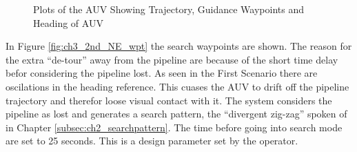 		\begin{figure}[htbp]
			\caption{Plots of the AUV Showing Trajectory, Guidance Waypoints and Heading of AUV}
			\label{fig:ch3_2nd_NE_plots}
		\end{figure}
		In Figure \ref{fig:ch3_2nd_NE_wpt} the search waypoints are shown. The reason for the extra
		``de-tour'' away from the pipeline are because of the short time delay befor considering the
		pipeline lost. As seen in the First Scenario there are oscilations in the heading reference.
		This cuases the AUV to drift off the pipeline trajectory and therefor loose visual contact
		with it. The system considers the pipeline as lost and generates a search pattern, the
		``divergent zig-zag'' spoken of in Chapter \ref{subsec:ch2_searchpattern}. The time before
		going into search mode are set to 25 seconds. This is a design parameter set by the operator.

